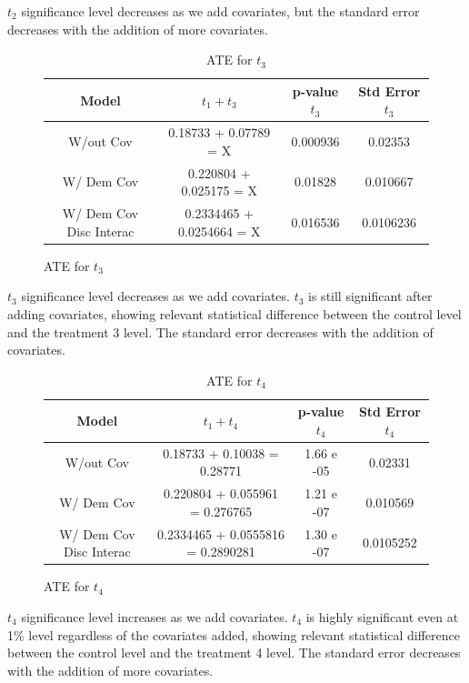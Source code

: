 \documentclass{article}
\begin{document}
$t_2$ significance level decreases as we add covariates, but the standard error decreases with the addition of more covariates.

\begin{figure}[H]
  \begin{table}[H]
  \centering
  \begin{tabular}{|cccc|}
    \hline
    Model & $t_1 + t_3$ & p-value $t_3$ & Std Error $t_3$ \\
    \hline
    W/out Cov                & 0.18733 + 0.07789 = X & 0.000936         & 0.02353 \\ 
    W/ Dem Cov               & 0.220804 + 0.025175 = X & 0.01828        & 0.010667 \\   
    W/ Dem Cov Disc Interac  & 0.2334465 + 0.0254664 = X & 0.016536    & 0.0106236 \\       
    \hline
  \end{tabular}
  \caption{ATE for $t_3$}
\end{table}
\end{figure}

$t_3$ significance level decreases as we add covariates. $t_3$ is still significant after adding covariates, showing relevant statistical difference between the control level and the treatment 3 level. The standard error decreases with the addition of covariates.

\begin{figure}[H]
\begin{table}[H]
  \centering
  \begin{tabular}{|cccc|}
    \hline
    Model & $t_1 + t_4$ & p-value $t_4$ & Std Error $t_4$ \\
    \hline
    W/out Cov                & 0.18733 + 0.10038 = 0.28771 & 1.66 e -05          & 0.02331 \\
    W/ Dem Cov               & 0.220804 + 0.055961 = 0.276765 & 1.21 e -07       & 0.010569 \\ 
    W/ Dem Cov Disc Interac  & 0.2334465 + 0.0555816 = 0.2890281 & 1.30 e -07    & 0.0105252 \\   
    \hline
  \end{tabular}
  \caption{ATE for $t_4$}
\end{table}
\end{figure}

$t_4$ significance level increases as we add covariates. $t_4$ is highly significant even at 1\% level regardless of the covariates added, showing relevant statistical difference between the control level and the treatment 4 level.  The standard error decreases with the addition of more covariates.
\end{document}
